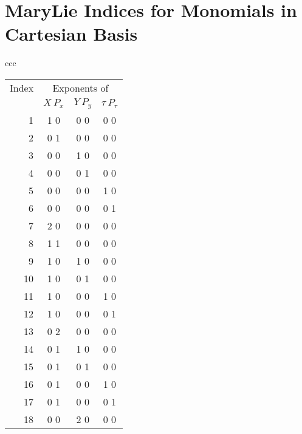 \section{MaryLie Indices for Monomials in Cartesian Basis}
{\normalsize
\begin{center}
\begin{tabular}{ccc}
\begin{tabular}{rccc}
\multicolumn{1}{c}{Index} &
\multicolumn{3}{c}{Exponents of}\\
&$X\:P_x$&$Y\:P_y$&$\tau\:P_{\tau}$\\
1\hspace*{.125in}&1 0&0 0&0 0\\
2\hspace*{.125in}&0 1&0 0&0 0\\
3\hspace*{.125in}&0 0&1 0&0 0\\
4\hspace*{.125in}&0 0&0 1&0 0\\
5\hspace*{.125in}&0 0&0 0&1 0\\
6\hspace*{.125in}&0 0&0 0&0 1\\
7\hspace*{.125in}&2 0&0 0&0 0\\
8\hspace*{.125in}&1 1&0 0&0 0\\
9\hspace*{.125in}&1 0&1 0&0 0\\
10\hspace*{.125in}&1 0&0 1&0 0\\
11\hspace*{.125in}&1 0&0 0&1 0\\
12\hspace*{.125in}&1 0&0 0&0 1\\
13\hspace*{.125in}&0 2&0 0&0 0\\
14\hspace*{.125in}&0 1&1 0&0 0\\
15\hspace*{.125in}&0 1&0 1&0 0\\
16\hspace*{.125in}&0 1&0 0&1 0\\
17\hspace*{.125in}&0 1&0 0&0 1\\
18\hspace*{.125in}&0 0&2 0&0 0\\

\end{tabular}
\end{tabular}
\end{center}}

